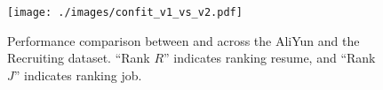 \begin{figure}[!t]
    \centering
    \texttt{[image: ./images/confit\_v1\_vs\_v2.pdf]}
    \caption{Performance comparison between \framework{} and \confitold{} across the AliYun and the Recruiting dataset. ``Rank $R$'' indicates ranking resume, and ``Rank $J$'' indicates ranking job.
    }
    \label{fig:confit_v1_vs_v2}
\end{figure}
